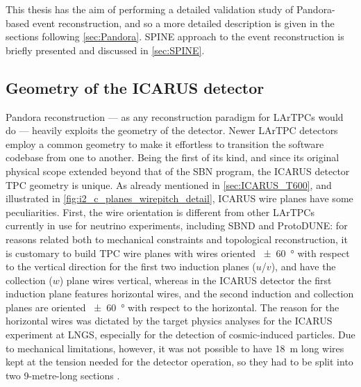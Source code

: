 This thesis has the aim of performing a detailed validation study of Pandora-based event reconstruction, and so a more detailed description is given in the sections following \autoref{sec:Pandora}. SPINE approach to the event reconstruction is briefly presented and discussed in \autoref{sec:SPINE}.

\subsection{Geometry of the ICARUS detector}

Pandora reconstruction --- as any reconstruction paradigm for LArTPCs would do --- heavily exploits the geometry of the detector. Newer LArTPC detectors employ a common geometry to make it effortless to transition the software codebase from one to another. Being the first of its kind, and since its original physical scope extended beyond that of the SBN program, the ICARUS detector TPC geometry is unique. As already mentioned in \autoref{sec:ICARUS_T600}, and illustrated in \autoref{fig:i2_c_planes_wirepitch_detail}, ICARUS wire planes have some peculiarities. First, the wire orientation is different from other LArTPCs currently in use for neutrino experiments, including SBND and ProtoDUNE: for reasons related both to mechanical constraints and topological reconstruction, it is customary to build TPC wire planes with wires oriented \SI{+-60}{\degree} with respect to the vertical direction for the first two induction planes ($u$/$v$), and have the collection ($w$) plane wires vertical, whereas in the ICARUS detector the first induction plane features horizontal wires, and the second induction and collection planes are oriented \SI{+-60}{\degree} with respect to the horizontal. The reason for the horizontal wires was dictated by the target physics analyses for the ICARUS experiment at LNGS, especially for the detection of cosmic-induced particles. Due to mechanical limitations, however, it was not possible to have \SI{18}{\metre} long wires kept at the tension needed for the detector operation, so they had to be split into two 9-metre-long sections \cite{amerioDesignConstructionTests2004c}. 

